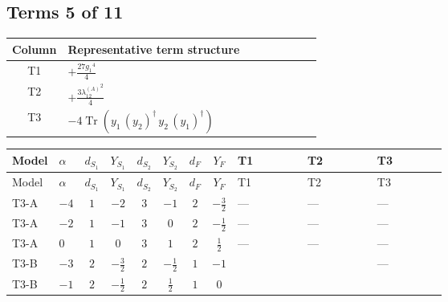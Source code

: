 \documentclass[8pt]{article}
\begin{document}
\begin{landscape}
\subsection*{Terms 5 of 11}
\begin{center}
\begin{tabular}{@{}c >{\raggedright\arraybackslash}p{0.82\linewidth}@{}}
\toprule
Column & Representative term structure \\
\midrule
T1 & \(\displaystyle +\frac{27 {g_1}^4}{4}\) \\
\midrule
T2 & \(\displaystyle +\frac{3 {\lambda_{12}^{(A)}}^2}{4}\) \\
\midrule
T3 & \(\displaystyle -4 \operatorname{Tr}\!\left({y_1}\,\left({y_2}\right)^{\dagger}\,{y_2}\,\left({y_1}\right)^{\dagger}\right)\) \\
\midrule
\bottomrule
\end{tabular}
\end{center}
\smallskip
\tiny
\begin{longtable}{@{}llcccccc >{\raggedright\arraybackslash}p{0.21\linewidth} >{\raggedright\arraybackslash}p{0.21\linewidth} >{\raggedright\arraybackslash}p{0.21\linewidth}@{}}
\toprule
Model & $\alpha$ & $d_{S_1}$ & $Y_{S_1}$ & $d_{S_2}$ & $Y_{S_2}$ & $d_F$ & $Y_F$ & T1 & T2 & T3 \\
\midrule
\endfirsthead
\toprule
Model & $\alpha$ & $d_{S_1}$ & $Y_{S_1}$ & $d_{S_2}$ & $Y_{S_2}$ & $d_F$ & $Y_F$ & T1 & T2 & T3 \\
\midrule
\endhead
T3-A & $-4$ & $1$ & $-2$ & $3$ & $-1$ & $2$ & $-\frac{3}{2}$ & --- & --- & --- \\
\midrule
T3-A & $-2$ & $1$ & $-1$ & $3$ & $0$ & $2$ & $-\frac{1}{2}$ & --- & --- & --- \\
\midrule
T3-A & $0$ & $1$ & $0$ & $3$ & $1$ & $2$ & $\frac{1}{2}$ & --- & --- & --- \\
\midrule
T3-B & $-3$ & $2$ & $-\frac{3}{2}$ & $2$ & $-\frac{1}{2}$ & $1$ & $-1$ & \scriptsize\adjustbox{max width=\linewidth}{$\begin{gathered} +\frac{27 {g_1}^4}{4}\end{gathered}$} & \scriptsize\adjustbox{max width=\linewidth}{$\begin{gathered} +\frac{3 {\lambda_{12}^{(A)}}^2}{4}\end{gathered}$} & --- \\
\midrule
T3-B & $-1$ & $2$ & $-\frac{1}{2}$ & $2$ & $\frac{1}{2}$ & $1$ & $0$ & \scriptsize\adjustbox{max width=\linewidth}{$\begin{gathered} +\frac{3 {g_1}^4}{4}\end{gathered}$} & \scriptsize\adjustbox{max width=\linewidth}{$\begin{gathered} +\frac{3 {\lambda_{12}^{(A)}}^2}{4}\end{gathered}$} & \scriptsize\adjustbox{max width=\linewidth}{$\begin{gathered} -4 \operatorname{Tr}\!\left({y_1}\,\left({y_2}\right)^{\dagger}\,{y_2}\,\left({y_1}\right)^{\dagger}\right)\end{gathered}$} \\

\end{longtable}
\end{landscape}
\end{document}

